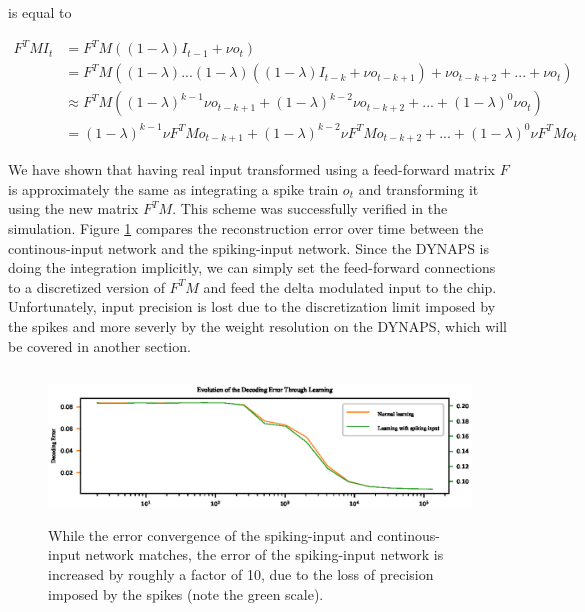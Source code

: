 \documentclass[twoside,11pt]{article}
\begin{document}
is equal to

\begin{equation*}
  \begin{split}
      F^T M I_t & = F^T M ((1-\lambda) I_{t-1} + \nu o_t) \\
      & = F^T M((1-\lambda) ... (1-\lambda)( (1-\lambda) I_{t-k} + \nu o_{t-k+1}) + \nu o_{t-k+2} + ... + \nu o_t) \\
      & \approx F^T M((1-\lambda)^{k-1}\nu o_{t-k+1} + (1-\lambda)^{k-2}\nu o_{t-k+2} + ... + (1-\lambda)^{0}\nu o_{t}) \\
      & = (1-\lambda)^{k-1}\nu F^TMo_{t-k+1} + (1-\lambda)^{k-2}\nu F^TMo_{t-k+2} + ... + (1-\lambda)^0 \nu F^TMo_t
  \end{split}
\end{equation*}

We have shown that having real input transformed using a feed-forward matrix $F$ is approximately the same
as integrating a spike train $o_t$ and transforming it using the new matrix $F^TM$. This
scheme was successfully verified in the simulation. Figure \ref{fig:spiking_vs_continous} compares the reconstruction error over time
between the continous-input network and the spiking-input network.
Since the DYNAPS is doing the integration implicitly, we can simply set the feed-forward
connections to a discretized version of $F^TM$ and feed the delta modulated input to the chip. Unfortunately,
input precision is lost due to the discretization limit imposed by the spikes and more severly by the
weight resolution on the DYNAPS, which will be covered in another section.

\begin{figure}[!htb]
  \includegraphics[width = \columnwidth, height=4cm]{figures/error_convergence_use_spiking_vs_normal.eps}
  \caption{While the error convergence of the spiking-input and continous-input network matches,
  the error of the spiking-input network is increased by roughly a factor of 10, due to the
  loss of precision imposed by the spikes (note the green scale).}
  \label{fig:spiking_vs_continous}
\end{figure}
\end{document}
